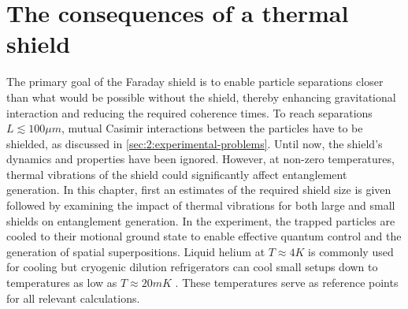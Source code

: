 \chapter{The consequences of a thermal shield}\label{cha:the-shield}
The primary goal of the Faraday shield is to enable particle separations closer than what would be possible without the shield, thereby enhancing gravitational interaction and reducing the required coherence times.
To reach separations $L \lesssim 100\si{\mu m}$, mutual Casimir interactions between the particles have to be shielded, as discussed in \cref{sec:2:experimental-problems}.
Until now, the shield's dynamics and properties have been ignored. However, at non-zero temperatures, thermal vibrations of the shield could significantly affect entanglement generation.
In this chapter, first an estimates of the required shield size is given followed by examining the impact of thermal vibrations for both large and small shields on entanglement generation.
In the experiment, the trapped particles are cooled to their motional ground state to enable effective quantum control and the generation of spatial superpositions.
Liquid helium at $T \approx 4\si{K}$ is commonly used for cooling but cryogenic dilution refrigerators can cool small setups down to temperatures as low as $T \approx 20\si{mK}$ \cite{Zu_2022}.
These temperatures serve as reference points for all relevant calculations.








